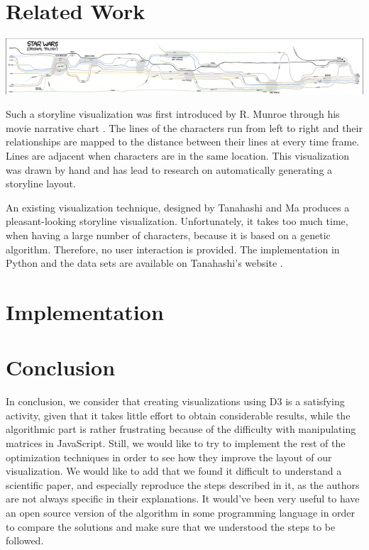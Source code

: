 \documentclass{report}
\begin{document}
\chapter{Related Work}
\includegraphics{movie_narrative_chart_star_wars_resized}
\par
Such a storyline visualization was first introduced by R. Munroe through his movie narrative chart \cite{xkcd}. The lines of the characters run from left to right and their relationships are mapped to the distance between their lines at every time frame. Lines are adjacent when characters are in the same location. This visualization was drawn by hand and has lead to research on automatically generating a storyline layout.
\par
An existing visualization technique, designed by Tanahashi and Ma \cite{tanahashi} produces a pleasant-looking storyline visualization. Unfortunately, it takes too much time, when having a large number of characters, because it is based on a genetic algorithm. Therefore, no user interaction is provided. The implementation in Python and the data sets are available on Tanahashi's website \cite{website:tanahashi}.

\chapter{Implementation}

\chapter{Conclusion}
In conclusion, we consider that creating visualizations using D3 is a satisfying activity, given that it takes little effort to obtain considerable results, while the algorithmic part is rather frustrating because of the difficulty with manipulating matrices in JavaScript. Still, we would like to try to implement the rest of the optimization techniques in order to see how they improve the layout of our visualization. We would like to add that we found it difficult to understand a scientific paper, and especially reproduce the steps described in it, as the authors are not always specific in their explanations. It would've been very useful to have an open source version of the algorithm in some programming language in order to compare the solutions and make sure that we understood the steps to be followed.

  

\end{document}
